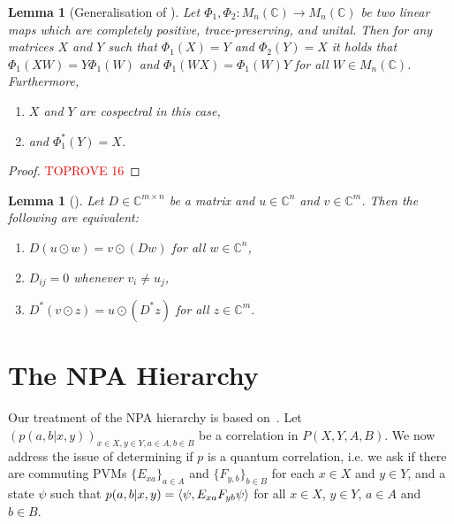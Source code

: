 \documentclass[11pt,a4paper]{article}
\theoremstyle{plain}
\newtheorem{lem}[thm]{Lemma}
\theoremstyle{remark}
\theoremstyle{definition}
\newcommand{\complex}{\mathbb{C}}
\begin{document}
\begin{lem}[Generalisation of {\cite[Lemma 4.9]{david_mathprog}}]
  \label{lem:lingalg_series}
  Let $\Phi_1, \Phi_2\colon M_n(\mathbb{C}) \to M_n(\mathbb{C})$ be two linear maps which are completely positive, trace-preserving, and unital.
  Then for any matrices $X$ and $Y$ such that $\Phi_1(X) = Y$ and $\Phi_2(Y) = X$ it holds that $\Phi_1(XW) = Y\Phi_1(W)$ and $\Phi_1(WX) = \Phi_1(W)Y$ for all $W \in M_n(\mathbb{C})$. Furthermore, 
  
  \begin{enumerate}[label = \roman*.]
      \item $X$ and $Y$ are cospectral in this case,
      \item and $\Phi_1^*(Y) = X$. 
  \end{enumerate}
\end{lem}
\begin{proof}\textcolor{red}{TOPROVE 16}\end{proof}

\begin{lem}[{\cite[Lemma 4.5]{david_mathprog}}]
  \label{lem:linalg_parallel}
  Let $D\in\complex^{m\times n}$ be a matrix and $u\in\complex^n$ and $v \in \complex^{m}$.
  Then the following are equivalent:
  \begin{enumerate}
    \item $D(u\odot w) = v\odot(Dw)$ for all $w\in\complex^n$,
    \item $D_{ij} = 0$ whenever $v_i \neq u_j$,
    \item $D^*(v\odot z) = u\odot(D^*z)$ for all $z\in\complex^m$.
  \end{enumerate}
\end{lem}



\section{The NPA Hierarchy}\label{sec:npa}

Our treatment of the NPA hierarchy is based on~\cite[Chapter 8]{watrous_notes}.
Let $(p(a,b|x,y))_{x \in X, y \in Y, a \in A, b \in B}$ be a correlation in $P(X, Y, A, B)$. We now address the issue of determining if $p$ is a quantum correlation, i.e. we ask if there are commuting PVMs $\{E_{xa}\}_{a \in A}$ and $\{F_{y,b}\}_{b \in B}$ for each $x \in X$ and $y \in Y$, and a state $\psi$ such that $p(a,b|x,y) = \braket{ \psi, E_{xa} F_{yb} \psi}$ for all $x \in X$, $y \in Y$, $a \in A$ and $b \in B$. 
\end{document}
